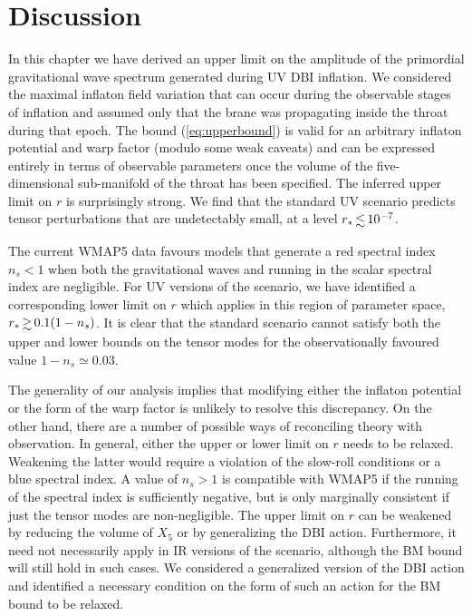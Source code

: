 \section{Discussion}
\label{sec:conclusion-dbi}

In this chapter we have derived an upper limit on
the amplitude of the primordial gravitational wave spectrum
generated during UV DBI inflation. We considered   
the maximal inflaton field variation   
that can occur during the observable stages of inflation and assumed  
only that the brane was propagating inside the throat during that epoch. 
The bound (\ref{eq:upperbound}) is valid for an arbitrary inflaton potential and 
warp factor (modulo some weak caveats) and can be expressed 
entirely in terms of observable parameters once the volume of 
the five-dimensional sub-manifold of the throat has been specified. 
The inferred upper limit on $r$ is surprisingly strong. 
We find that the standard UV  
scenario predicts tensor perturbations that are undetectably small, 
at a level ${r_*} \, {\lsim} \, {10^{-7}}$. 

The current WMAP5 data 
favours models that generate a red spectral index $n_s<1$
when both the gravitational waves and running in the scalar 
spectral index are negligible. For UV versions of the scenario, 
we have identified a corresponding 
lower limit on $r$ which applies in this region of 
parameter space, $r_* \, \gsim \, 0.1 (1-n_s)$. It is clear that 
the standard scenario 
cannot satisfy both the upper and lower bounds 
on the tensor modes for the observationally favoured value 
$1-n_s \simeq 0.03$.


The generality of our 
analysis implies that modifying either the inflaton potential 
or the form of the warp factor is unlikely to resolve this discrepancy. 
On the other hand, there are a number of possible ways of reconciling  
theory with observation. In general, 
either the upper or lower limit on $r$ needs to be relaxed. 
Weakening the latter would require a violation of the slow-roll 
conditions or a blue spectral index. 
A value of $n_s >1$ is compatible with WMAP5 if the running of the 
spectral index 
is sufficiently negative, but is only marginally
consistent if just the tensor modes are non-negligible.  The 
upper limit on $r$ can be weakened by reducing 
the volume of $X_5$ or 
by generalizing the DBI action. Furthermore, it need not necessarily 
apply in IR versions of the scenario, although the BM bound will still hold
in such cases. 
We considered a generalized version of the 
DBI action and identified a necessary condition on the form of such  
an action for the BM bound to be relaxed.

